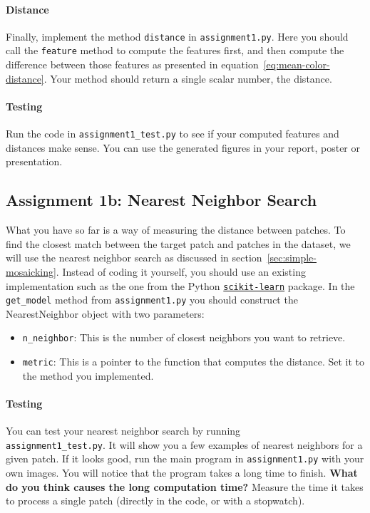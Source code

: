\documentclass[a4paper]{article}
\begin{document}
		\paragraph{Distance}
		Finally, implement the method \verb|distance| in \verb|assignment1.py|.
		Here you should call the \verb|feature| method to compute the features first, and then compute the difference between those features as presented in equation~\ref{eq:mean-color-distance}.
		Your method should return a single scalar number, the distance.
		
		\paragraph{Testing}
		Run the code in \verb|assignment1_test.py| to see if your computed features and distances make sense.
		You can use the generated figures in your report, poster or presentation.
		
	\subsection{Assignment 1b: Nearest Neighbor Search}
		What you have so far is a way of measuring the distance between patches.
		To find the closest match between the target patch and patches in the dataset, we will use the nearest neighbor search as discussed in section~\ref{sec:simple-mosaicking}. 
		Instead of coding it yourself, you should use an existing implementation such as the one from the Python 
		\href{http://scikit-learn.org/stable/modules/neighbors.html}{\texttt{scikit-learn}} package.
		In the \verb|get_model| method from \verb|assignment1.py| you should construct the NearestNeighbor object with two parameters:
		\begin{itemize}
			\item \verb|n_neighbor|: This is the number of closest neighbors you want to retrieve. 
			\item \verb|metric|: This is a pointer to the function that computes the distance. 
			Set it to the method you implemented.
		\end{itemize}
	
		\paragraph{Testing}
		You can test your nearest neighbor search by running \\
		\verb|assignment1_test.py|. 
		It will show you a few examples of nearest neighbors for a given patch.
		If it looks good, run the main program in \verb|assignment1.py| with your own images.
		You will notice that the program takes a long time to finish. 
		\textbf{What do you think causes the long computation time?}
		Measure the time it takes to process a single patch (directly in the code, or with a stopwatch).
	
\end{document}
